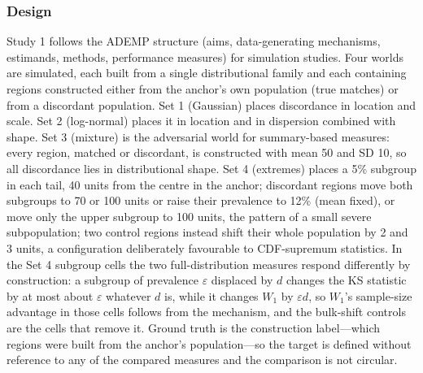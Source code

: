 \documentclass[AMA,Times1COL]{WileyNJDv5}
\begin{document}

\subsubsection{Design}\label{sec:study1_design}

Study 1 follows the ADEMP structure (aims, data-generating mechanisms, estimands, methods, performance measures) for simulation studies.\cite{morris2019} Four worlds are simulated, each built from a single distributional family and each containing regions constructed either from the anchor's own population (true matches) or from a discordant population. Set 1 (Gaussian) places discordance in location and scale. Set 2 (log-normal) places it in location and in dispersion combined with shape. Set 3 (mixture) is the adversarial world for summary-based measures: every region, matched or discordant, is constructed with mean 50 and SD 10, so all discordance lies in distributional shape. Set 4 (extremes) places a 5\% subgroup in each tail, 40 units from the centre in the anchor; discordant regions move both subgroups to 70 or 100 units or raise their prevalence to 12\% (mean fixed), or move only the upper subgroup to 100 units, the pattern of a small severe subpopulation; two control regions instead shift their whole population by 2 and 3 units, a configuration deliberately favourable to CDF-supremum statistics. In the Set 4 subgroup cells the two full-distribution measures respond differently by construction: a subgroup of prevalence $\varepsilon$ displaced by $d$ changes the KS statistic by at most about $\varepsilon$ whatever $d$ is, while it changes $W_1$ by $\varepsilon d$, so $W_1$'s sample-size advantage in those cells follows from the mechanism, and the bulk-shift controls are the cells that remove it. Ground truth is the construction label---which regions were built from the anchor's population---so the target is defined without reference to any of the compared measures and the comparison is not circular.
\end{document}
